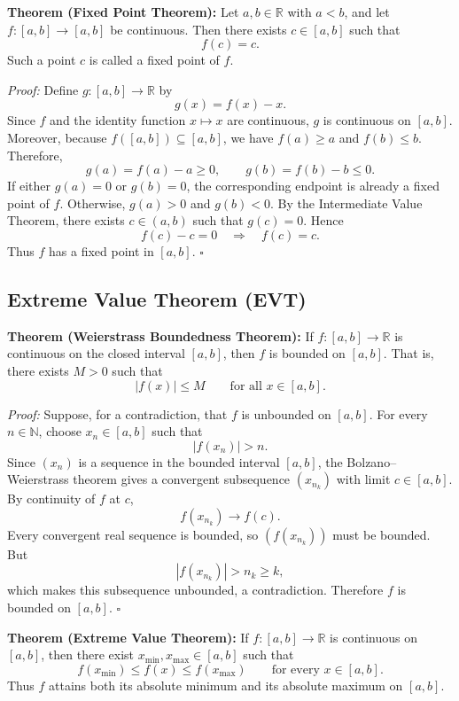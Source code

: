 \documentclass[a4paper,11pt,abstracton]{scrartcl}
\newcommand{\RR}{\mathbb{R}}
\theoremstyle{dotlessP}
\theoremstyle{dotlessS}
\theoremstyle{remark}
\theoremstyle{definition}
\begin{document}
\begin{problem_box}
\textbf{Theorem (Fixed Point Theorem):}
Let $a,b\in\RR$ with $a<b$, and let $f:[a,b]\to[a,b]$ be continuous. Then there exists $c\in[a,b]$ such that
\[
    f(c)=c.
\]
Such a point $c$ is called a fixed point of $f$.
\end{problem_box}

\begin{claim_box}
\textit{Proof:}
Define $g:[a,b]\to\RR$ by
\[
    g(x)=f(x)-x.
\]
Since $f$ and the identity function $x\mapsto x$ are continuous, $g$ is continuous on $[a,b]$. Moreover, because $f([a,b])\subseteq[a,b]$, we have $f(a)\ge a$ and $f(b)\le b$. Therefore,
\[
    g(a)=f(a)-a\ge0,\qquad g(b)=f(b)-b\le0.
\]
If either $g(a)=0$ or $g(b)=0$, the corresponding endpoint is already a fixed point of $f$. Otherwise, $g(a)>0$ and $g(b)<0$. By the Intermediate Value Theorem, there exists $c\in(a,b)$ such that $g(c)=0$. Hence
\[
    f(c)-c=0\quad\Longrightarrow\quad f(c)=c.
\]
Thus $f$ has a fixed point in $[a,b]$.
\hfill$\square$
\end{claim_box}

\subsection{Extreme Value Theorem (EVT)}

\begin{problem_box}
\textbf{Theorem (Weierstrass Boundedness Theorem):}
If $f:[a,b]\to\RR$ is continuous on the closed interval $[a,b]$, then $f$ is bounded on $[a,b]$. That is, there exists $M>0$ such that
\[
    |f(x)|\le M \qquad\text{for all }x\in[a,b].
\]
\end{problem_box}

\begin{claim_box}
\textit{Proof:}
Suppose, for a contradiction, that $f$ is unbounded on $[a,b]$. For every $n\in\mathbb N$, choose $x_n\in[a,b]$ such that
\[
    |f(x_n)|>n.
\]
Since $(x_n)$ is a sequence in the bounded interval $[a,b]$, the Bolzano--Weierstrass theorem gives a convergent subsequence $(x_{n_k})$ with limit $c\in[a,b]$. By continuity of $f$ at $c$,
\[
    f(x_{n_k})\longrightarrow f(c).
\]
Every convergent real sequence is bounded, so $(f(x_{n_k}))$ must be bounded. But
\[
    |f(x_{n_k})|>n_k\ge k,
\]
which makes this subsequence unbounded, a contradiction. Therefore $f$ is bounded on $[a,b]$.
\hfill$\square$
\end{claim_box}

\begin{problem_box}
\textbf{Theorem (Extreme Value Theorem):}
If $f:[a,b]\to\RR$ is continuous on $[a,b]$, then there exist $x_{\min},x_{\max}\in[a,b]$ such that
\[
    f(x_{\min})\le f(x)\le f(x_{\max})
    \qquad\text{for every }x\in[a,b].
\]
Thus $f$ attains both its absolute minimum and its absolute maximum on $[a,b]$.
\end{problem_box}
\end{document}
